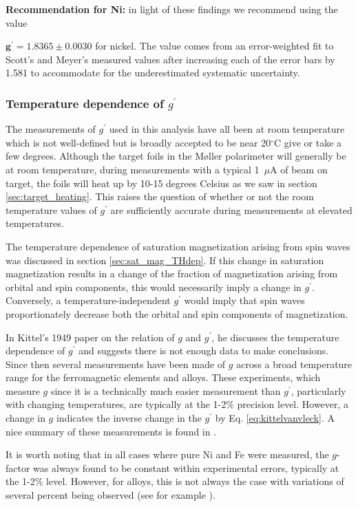 \documentclass[preprint,12pt]{elsarticle}
\begin{document}
{\bf Recommendation for Ni:} in light of these findings we recommend using the value {$\bm{ g^{\prime}=1.8365\pm0.0030}$ for nickel. The value comes from an error-weighted fit to Scott's and Meyer's measured values after increasing each of the error bars by 1.581 to accommodate for the underestimated systematic uncertainty. 

\subsubsection{\label{sec:gp_temp_dep}Temperature dependence of $g^{\prime}$}
The measurements of $g^{\prime}$ used in this analysis have all been at room temperature which is not well-defined but is broadly accepted to be near 20$^{\circ}$C give or take a few degrees. Although the target foils in the M\o ller polarimeter will generally be at room temperature, during measurements with a typical 1~$\mu$A of beam on target, the foils will heat up by 10-15 degrees Celsius as we saw in section \ref{sec:target_heating}. This raises the question of whether or not the room temperature values of $g^{\prime}$ are sufficiently accurate during measurements at elevated temperatures.

The temperature dependence of saturation magnetization arising from spin waves was discussed in section \ref{sec:sat_mag_THdep}. If this change in saturation magnetization results in a change of the fraction of magnetization arising from orbital and spin components, this would necessarily imply a change in $g^\prime$. Conversely, a temperature-independent $g^\prime$ would imply that spin waves proportionately decrease both the orbital and spin components of magnetization. 

In Kittel's 1949 paper on the relation of $g$ and $g^{\prime}$, he discusses the temperature dependence of $g^{\prime}$ and suggests there is not enough data to make conclusions\cite{Kittel1949}. Since then several measurements have been made of $g$ across a broad temperature range for the ferromagnetic elements and alloys. These experiments, which measure $g$ since it is a technically much easier measurement than $g^{\prime}$, particularly with changing temperatures, are typically at the 1-2\% precision level. However, a change in $g$ indicates the inverse change in the  $g^{\prime}$ by Eq. \ref{eq:kittelvanvleck}. A nice summary of these measurements is found in \cite{borovik1988}.

It is worth noting that in all cases where pure Ni and Fe were measured, the $g$-factor was always found to be constant within experimental errors, typically at the 1-2\% level. However, for alloys, this is not always the case with variations of several percent being observed (see for example \cite{Gadsden1978, Shanina1998}).

}
\end{document}

